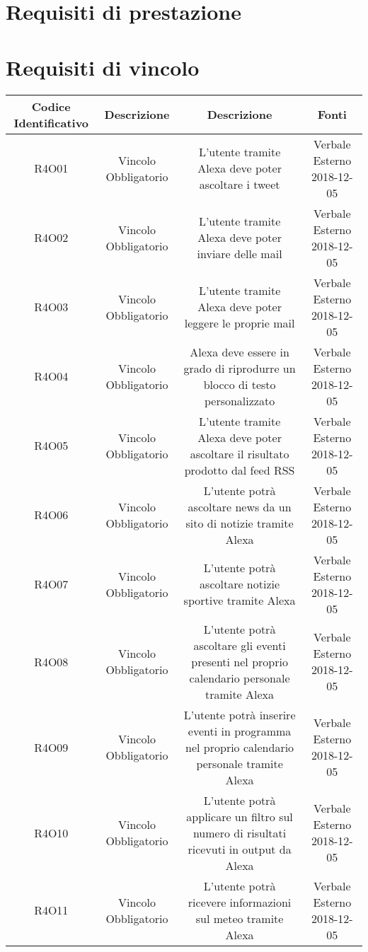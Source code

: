 \section{Requisiti di prestazione}

\section{Requisiti di vincolo}
\begin{tabularx}{\textwidth}{|C|C|C|C|}
	\hline
	\textbf{Codice Identificativo}& \textbf{Descrizione} & \textbf{Descrizione} & \textbf{Fonti}\\
	\hline	
	\endhead
	R4O01&Vincolo Obbligatorio  &L'utente tramite Alexa deve poter ascoltare i tweet & Verbale Esterno 2018-12-05 \\
	\hline
	R4O02&Vincolo Obbligatorio  &L'utente tramite Alexa deve poter inviare delle mail & Verbale Esterno 2018-12-05 \\
	\hline
	R4O03&Vincolo Obbligatorio  &L'utente tramite Alexa deve poter leggere le proprie mail & Verbale Esterno 2018-12-05 \\
	\hline
	R4O04&Vincolo Obbligatorio  &Alexa deve essere in grado di riprodurre un blocco di testo personalizzato & Verbale Esterno 2018-12-05 \\
	\hline
	R4O05&Vincolo Obbligatorio  &L'utente tramite Alexa deve poter ascoltare il risultato prodotto dal feed RSS & Verbale Esterno 2018-12-05 \\
	\hline
	R4O06 &Vincolo Obbligatorio& L'utente potrà ascoltare news da un sito di notizie tramite Alexa &Verbale Esterno 2018-12-05\\
	\hline
	R4O07 &Vincolo Obbligatorio& L'utente potrà ascoltare notizie sportive tramite Alexa  &Verbale Esterno 2018-12-05\\
	\hline
	R4O08 &Vincolo Obbligatorio&L'utente potrà ascoltare gli eventi presenti nel proprio calendario personale tramite Alexa  &Verbale Esterno 2018-12-05\\
	\hline
	R4O09 &Vincolo Obbligatorio& L'utente potrà inserire eventi in programma nel proprio calendario personale  tramite Alexa& Verbale Esterno 2018-12-05\\
	\hline
	R4O10 &Vincolo Obbligatorio &L'utente potrà applicare un filtro sul numero di risultati ricevuti in output da Alexa &Verbale Esterno 2018-12-05\\
	\hline
	R4O11 &Vincolo Obbligatorio &L'utente potrà ricevere informazioni sul meteo tramite Alexa& Verbale Esterno 2018-12-05\\

\end{tabularx}
